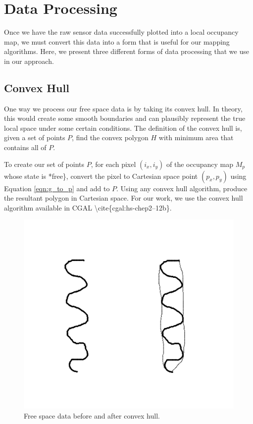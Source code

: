 \section{Data Processing}
\label{dataprocessing}

Once we have the raw sensor data successfully plotted into a local occupancy map, we must convert this data into a form that is useful for our mapping algorithms. Here, we present three different forms of data processing that we use in our approach.

\subsection{Convex Hull}
\label{convexhull}

One way we process our free space data is by taking its convex hull. In theory, this would create some smooth boundaries and can plausibly represent the true local space under some certain conditions. The definition of the convex hull is, given a set of points $P$, find the convex polygon $H$ with minimum area that contains all of $P$.

To create our set of points $P$, for each pixel $(i_x,i_y)$ of the occupancy map $M_p$ whose state is *free\}, convert the pixel to Cartesian space point $(p_x,p_y)$ using Equation \autoref{eqn:g_to_p} and add to $P$. Using any convex hull algorithm, produce the resultant polygon in Cartesian space. For our work, we use the convex hull algorithm available in CGAL \textbackslash{}cite\{cgal:hs-chep2--12b\}.

\begin{figure}[htbp]
\centering
\includegraphics[keepaspectratio,width=400pt,height=0.75\textheight]{4_convex_freespace1.png}
\caption{Free space data before and after convex hull.}
\label{convex_free1}
\end{figure}



